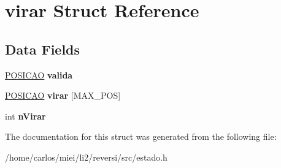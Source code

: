 \hypertarget{structvirar}{}\section{virar Struct Reference}
\label{structvirar}
\subsection*{Data Fields}
\begin{DoxyCompactItemize}
\item 
\mbox{\label{structvirar_a16a3c396b72def80c6cfae884cdbedb3}} 
\mbox{\hyperlink{structposicao}{P\+O\+S\+I\+C\+AO}} {\bfseries valida}
\item 
\mbox{\label{structvirar_a6fbc22622ba2a097c0f47fa3e811040b}} 
\mbox{\hyperlink{structposicao}{P\+O\+S\+I\+C\+AO}} {\bfseries virar} \mbox{[}M\+A\+X\+\_\+\+P\+OS\mbox{]}
\item 
\mbox{\label{structvirar_a780b245be90e6e673d5f3bb528db89c2}} 
int {\bfseries n\+Virar}
\end{DoxyCompactItemize}


The documentation for this struct was generated from the following file\+:\begin{DoxyCompactItemize}
\item 
/home/carlos/miei/li2/reversi/src/estado.\+h\end{DoxyCompactItemize}
